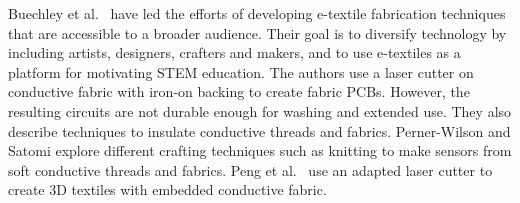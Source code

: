 Buechley et al.\ \cite{Buechley2009} have led the efforts of developing e-textile fabrication techniques that are accessible to a broader audience. Their goal is to diversify technology by including artists, designers, crafters and makers, and to use e-textiles as a platform for motivating STEM education. The authors use a laser cutter on conductive fabric with iron-on backing to create fabric PCBs. However, the resulting circuits are not durable enough for washing and extended use. They also describe techniques to insulate conductive threads and fabrics. %
Perner-Wilson and Satomi \cite{perner2011handcrafting} explore different crafting techniques such as knitting to make sensors from soft conductive threads and fabrics. Peng et al.\  \cite{peng2015layered} use an adapted laser cutter to create 3D textiles with embedded conductive fabric.





